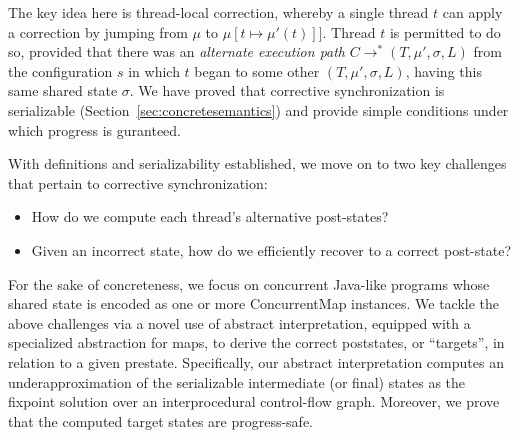 The key idea here is thread-local correction, whereby a single
thread $t$ can apply a correction by jumping from $\mu$ to
$\mu[t \mapsto \mu'(t)]]$. Thread $t$ is permitted to do so,
  provided that there was an \emph{alternate execution path}
  $C \rightarrow^{*} (T,\mu',\sigma,L)$ from the configuration $s$
  in which $t$ began to some other $(T,\mu',\sigma,L)$, having this
  same shared state $\sigma$.
%
%
%
We have proved that corrective synchronization is serializable (Section~\ref{sec:concretesemantics})
and provide simple conditions under which progress is guranteed.

%
With definitions and serializability established, we move on to two key challenges
that pertain to corrective synchronization:
\begin{itemize}
\item How do we compute each thread's alternative post-states?
\item Given an incorrect state, how do we efficiently recover to a correct post-state?
\end{itemize}
%
For the sake of concreteness, we focus on concurrent Java-like
programs whose shared state is encoded as one or more {\sf
  ConcurrentMap} instances.  We tackle the above challenges via a
novel use of abstract interpretation, equipped with a specialized
abstraction for maps, to derive the correct poststates, or ``targets'', in relation to
a given prestate.
%
Specifically, our abstract interpretation computes an
underapproximation of the serializable intermediate (or final) states
as the fixpoint solution over an interprocedural control-flow graph.
%
Moreover, we prove that the computed target states are progress-safe.
  
%

